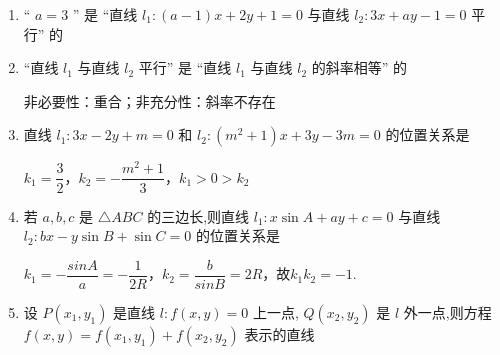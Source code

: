 \begin{enumerate}
\begin{jieda}
        又因为 $1 \times  \left( {m + 1}\right)  + \left( {-1}\right)  \times  \left( {m + 1}\right)  = 0$ ,所以 ${l}_{1} \bot  {l}_{2}$ ,
        即有 ${PA}\bot {PB}$ ,所以 ${\left| PA\right| }^{2} + {\left| PB\right| }^{2} = {\left| AB\right| }^{2} = 8$
        
        所以 $\left| {PA}\right|  + \left| {PB}\right|  \leq  \sqrt{2\left( {{\left| PA\right| }^{2} + {\left| PB\right| }^{2}}\right) } = 4$ ,
        当且仅当 $\left| {PA}\right|  = \left| {PB}\right|  = 2$ 时,取等号.
        所以 $\left| {PA}\right|  + \left| {PB}\right|$ 的最大值为 4 .
    \end{jieda}
    
    \item “ $a = 3$ ” 是 “直线 ${l}_{1} : \left( {a - 1}\right) x + {2y} + 1 = 0$ 与直线 ${l}_{2} : {3x} + {ay} - 1 = 0$ 平行” 的
    
    \item “直线 ${l}_{1}$ 与直线 ${l}_{2}$ 平行” 是 “直线 ${l}_{1}$ 与直线 ${l}_{2}$ 的斜率相等” 的
    \begin{jieda}
        非必要性：重合；非充分性：斜率不存在
    \end{jieda}
    
    \item 直线 ${l}_{1} : {3x} - {2y} + m = 0$ 和 ${l}_{2} : \left( {{m}^{2} + 1}\right) x + {3y} - {3m} = 0$ 的位置关系是
    \begin{jieda}
        $k_1 = \dfrac{3}{2}$，$k_2 = -\dfrac{m^2+1}{3}$，$k_1 > 0 > k_2$
    \end{jieda}
    
    \item 若 $a,b,c$ 是 $\bigtriangleup  {ABC}$ 的三边长,则直线 ${l}_{1} : x\sin A + {ay} + c = 0$ 与直线 ${l}_{2} : {bx} - y\sin B + \sin C = 0$ 的位置关系是
    \begin{jieda}
        $k_1 = -\dfrac{sinA}{a} = -\dfrac{1}{2R}$，$k_2 = \dfrac{b}{sinB} = 2R$，故$k_1k_2 = -1$.
    \end{jieda}
    
    \item 设 $P\left( {{x}_{1},{y}_{1}}\right)$ 是直线 $l : f\left( {x,y}\right)  = 0$ 上一点, $Q\left( {{x}_{2},{y}_{2}}\right)$ 是 $l$ 外一点,则方程 $f\left( {x,y}\right)  = f\left( {{x}_{1},{y}_{1}}\right)  + f\left( {{x}_{2},{y}_{2}}\right)$ 表示的直线
    

\end{enumerate}
